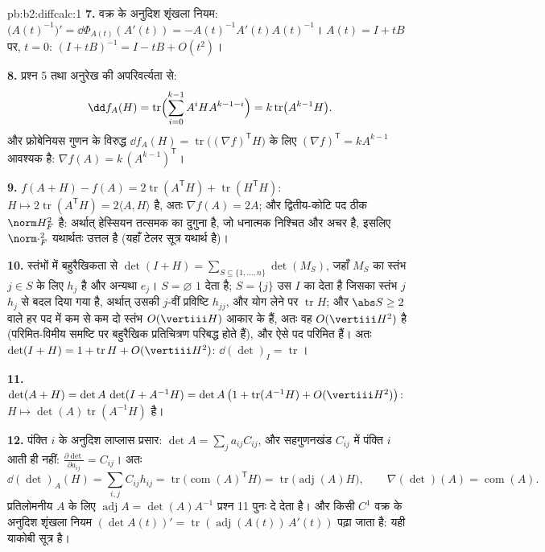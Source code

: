 \begin{solution}{pb:b2:diffcalc:1}
\textbf{7.} वक्र के अनुदिश शृंखला नियम: $\bigl(A(t)^{-1}\bigr)' = \dd\Phi_{A(t)}(A'(t)) =
-A(t)^{-1}A'(t)A(t)^{-1}$। $A(t) = I + tB$ पर, $t = 0$: $(I +
tB)^{-1} = I - tB + O(t^2)$।

\textbf{8.} प्रश्न 5 तथा अनुरेख की  अपरिवर्त्यता से:
\[
\dd f_A(H) = \operatorname{tr}\Bigl(\sum_{i=0}^{k-1}
A^iHA^{k-1-i}\Bigr) = k\operatorname{tr}\bigl(A^{k-1}H\bigr) .
\]
और फ्रोबेनियस गुणन के विरुद्ध $\dd f_A(H) =
\operatorname{tr}\bigl((\nabla f)^{\mathsf T}H\bigr)$ के लिए $(\nabla f)^{\mathsf T} = kA^{k-1}$ आवश्यक है: $\nabla f(A) =
k\,(A^{k-1})^{\mathsf T}$।

\textbf{9.} $f(A + H) - f(A) = 2\operatorname{tr}
(A^{\mathsf T}H) + \operatorname{tr}(H^{\mathsf T}H)$:  $H \mapsto 2\operatorname{tr}(A^{\mathsf T}H) =
2\langle A, H\rangle$ है, अतः $\nabla f(A) = 2A$; और द्वितीय-कोटि पद ठीक $\norm H_F^2$ है:
अर्थात् हेस्सियन तत्समक  का दुगुना है, जो धनात्मक निश्चित और
अचर है, इसलिए $\norm\cdot_F^2$ यथार्थतः उत्तल है (यहाँ टेलर सूत्र यथार्थ है)।

\textbf{10.} स्तंभों में बहुरैखिकता से $\det(I + H) =
\sum_{S\subseteq\{1,\dots,n\}}\det(M_S)$, जहाँ $M_S$ का स्तंभ $j \in S$ के लिए
$h_j$ है और अन्यथा $e_j$। $S = \varnothing$ $1$ देता है; $S = \{j\}$ उस $I$ का  देता है जिसका
स्तंभ $j$ $h_j$ से बदल दिया गया है, अर्थात् उसकी $j$-वीं प्रविष्टि $h_{jj}$,
और योग लेने पर $\operatorname{tr}H$; और $\abs S \geq 2$ वाले हर पद में कम से कम दो स्तंभ $O(\vertiii H)$ आकार
के हैं, अतः वह $O(\vertiii H^2)$ है (परिमित-विमीय समष्टि पर बहुरैखिक प्रतिचित्रण
परिबद्ध होते हैं), और ऐसे पद परिमित हैं। अतः $\det(I + H) = 1 + \operatorname{tr}H +
O(\vertiii H^2)$: $\dd(\det)_I = \operatorname{tr}$।

\textbf{11.} $\det(A + H) = \det A\,\det(I + A^{-1}H) =
\det A\,\bigl(1 + \operatorname{tr}(A^{-1}H) +
O(\vertiii H^2)\bigr)$:  $H \mapsto
\det(A)\operatorname{tr}(A^{-1}H)$ है।

\textbf{12.} पंक्ति $i$ के अनुदिश लाप्लास प्रसार: $\det A =
\sum_j a_{ij}C_{ij}$, और सहगुणनखंड $C_{ij}$
में पंक्ति $i$ आती ही नहीं: $\frac{\partial\det}{\partial a_{ij}} = C_{ij}$। अतः
\[
\dd(\det)_A(H) = \sum_{i,j}C_{ij}h_{ij}
= \operatorname{tr}\bigl(\operatorname{com}(A)^{\mathsf T}
H\bigr)
= \operatorname{tr}\bigl(\operatorname{adj}(A)H\bigr),
\qquad
\nabla(\det)(A) = \operatorname{com}(A) .
\]
प्रतिलोमनीय $A$ के लिए $\operatorname{adj}A = \det(A)A^{-1}$ प्रश्न 11 पुनः दे देता है। और किसी $C^1$ वक्र के
अनुदिश शृंखला नियम $(\det A(t))' = \operatorname{tr}(\operatorname{adj}
(A(t))\,A'(t))$ पढ़ा जाता है: यही याकोबी सूत्र है।


\end{solution}
